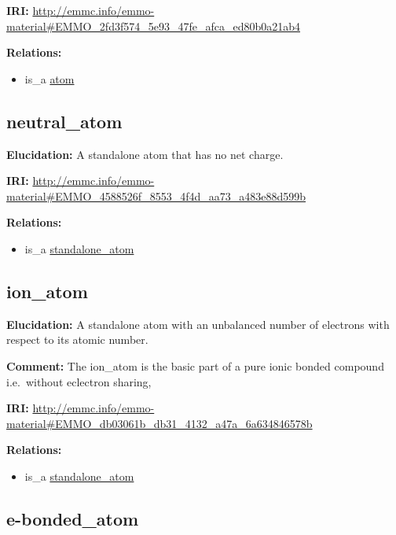 \documentclass[a4paper,]{report}
\providecommand{\tightlist}{%
  \setlength{\itemsep}{0pt}\setlength{\parskip}{0pt}}
\begin{document}
\textbf{IRI:}
\url{http://emmc.info/emmo-material\#EMMO_2fd3f574_5e93_47fe_afca_ed80b0a21ab4}

\textbf{Relations:}

\begin{itemize}
\tightlist
\item
  is\_a \protect\hyperlink{atom}{atom}
\end{itemize}

\hypertarget{neutral_atom}{%
\subsection{neutral\_atom}\label{neutral_atom}}

\textbf{Elucidation:} A standalone atom that has no net charge.

\textbf{IRI:}
\url{http://emmc.info/emmo-material\#EMMO_4588526f_8553_4f4d_aa73_a483e88d599b}

\textbf{Relations:}

\begin{itemize}
\tightlist
\item
  is\_a \protect\hyperlink{standalone_atom}{standalone\_atom}
\end{itemize}

\hypertarget{ion_atom}{%
\subsection{ion\_atom}\label{ion_atom}}

\textbf{Elucidation:} A standalone atom with an unbalanced number of
electrons with respect to its atomic number.

\textbf{Comment:} The ion\_atom is the basic part of a pure ionic bonded
compound i.e.~without eclectron sharing,

\textbf{IRI:}
\url{http://emmc.info/emmo-material\#EMMO_db03061b_db31_4132_a47a_6a634846578b}

\textbf{Relations:}

\begin{itemize}
\tightlist
\item
  is\_a \protect\hyperlink{standalone_atom}{standalone\_atom}
\end{itemize}

\hypertarget{e-bonded_atom}{%
\subsection{e-bonded\_atom}\label{e-bonded_atom}}
\end{document}
